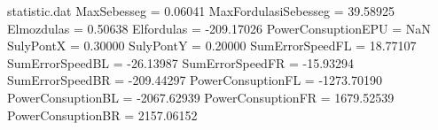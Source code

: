 \begin{filecontents*}{statistic.dat}
MaxSebesseg =    0.06041
MaxFordulasiSebesseg =   39.58925
Elmozdulas =    0.50638
Elfordulas = -209.17026
PowerConsuptionEPU =        NaN
SulyPontX =    0.30000
SulyPontY =    0.20000
SumErrorSpeedFL =   18.77107
SumErrorSpeedBL =  -26.13987
SumErrorSpeedFR =  -15.93294
SumErrorSpeedBR = -209.44297
PowerConsuptionFL = -1273.70190
PowerConsuptionBL = -2067.62939
PowerConsuptionFR = 1679.52539
PowerConsuptionBR = 2157.06152
\end{filecontents*}
